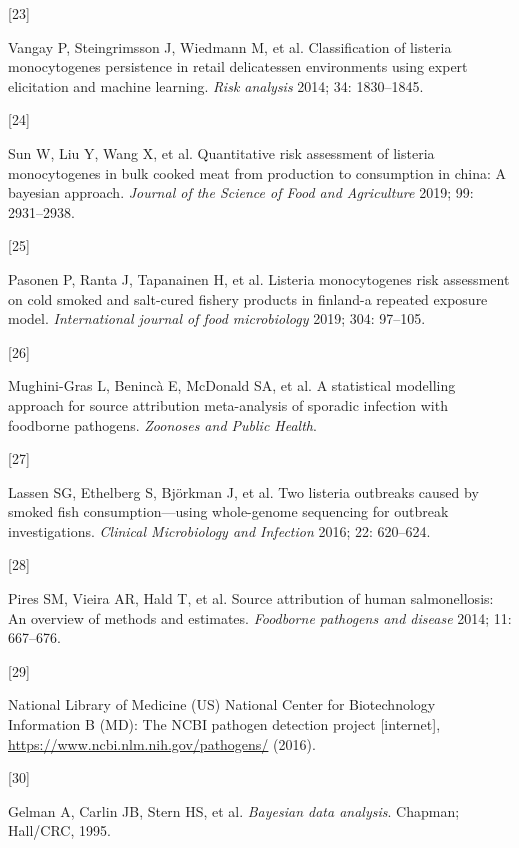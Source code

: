 \documentclass[
  10pt,
]{article}
\newlength{\cslhangindent}
\newlength{\csllabelwidth}
\newlength{\cslentryspacingunit} %
\newenvironment{CSLReferences}[2] %
 {%
  \setlength{\parindent}{0pt}
  \ifodd #1
  \let\oldpar\par
  \def\par{\hangindent=\cslhangindent\oldpar}
  \fi
  \setlength{\parskip}{#2\cslentryspacingunit}
 }%
 {}
\newcommand{\CSLLeftMargin}[1]{\parbox[t]{\csllabelwidth}{#1}}
\newcommand{\CSLRightInline}[1]{\parbox[t]{\linewidth - \csllabelwidth}{#1}\break}
\begin{document}
\begin{CSLReferences}{0}{0}
\leavevmode{}%
\CSLLeftMargin{{[}23{]} }%
\CSLRightInline{Vangay P, Steingrimsson J, Wiedmann M, et al. Classification of listeria monocytogenes persistence in retail delicatessen environments using expert elicitation and machine learning. \emph{Risk analysis} 2014; 34: 1830--1845.}

\leavevmode{}%
\CSLLeftMargin{{[}24{]} }%
\CSLRightInline{Sun W, Liu Y, Wang X, et al. Quantitative risk assessment of listeria monocytogenes in bulk cooked meat from production to consumption in china: A bayesian approach. \emph{Journal of the Science of Food and Agriculture} 2019; 99: 2931--2938.}

\leavevmode{}%
\CSLLeftMargin{{[}25{]} }%
\CSLRightInline{Pasonen P, Ranta J, Tapanainen H, et al. Listeria monocytogenes risk assessment on cold smoked and salt-cured fishery products in finland-a repeated exposure model. \emph{International journal of food microbiology} 2019; 304: 97--105.}

\leavevmode{}%
\CSLLeftMargin{{[}26{]} }%
\CSLRightInline{Mughini-Gras L, Benincà E, McDonald SA, et al. A statistical modelling approach for source attribution meta-analysis of sporadic infection with foodborne pathogens. \emph{Zoonoses and Public Health}.}

\leavevmode{}%
\CSLLeftMargin{{[}27{]} }%
\CSLRightInline{Lassen SG, Ethelberg S, Björkman J, et al. Two listeria outbreaks caused by smoked fish consumption---using whole-genome sequencing for outbreak investigations. \emph{Clinical Microbiology and Infection} 2016; 22: 620--624.}

\leavevmode{}%
\CSLLeftMargin{{[}28{]} }%
\CSLRightInline{Pires SM, Vieira AR, Hald T, et al. Source attribution of human salmonellosis: An overview of methods and estimates. \emph{Foodborne pathogens and disease} 2014; 11: 667--676.}

\leavevmode{}%
\CSLLeftMargin{{[}29{]} }%
\CSLRightInline{National Library of Medicine (US) National Center for Biotechnology Information B (MD): The NCBI pathogen detection project {[}internet{]}, \url{https://www.ncbi.nlm.nih.gov/pathogens/} (2016).}

\leavevmode{}%
\CSLLeftMargin{{[}30{]} }%
\CSLRightInline{Gelman A, Carlin JB, Stern HS, et al. \emph{Bayesian data analysis}. Chapman; Hall/CRC, 1995.}


\end{CSLReferences}
\end{document}
